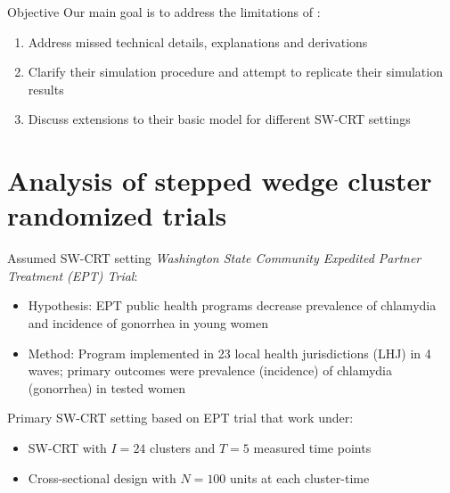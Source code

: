 \documentclass[9pt]{beamer}
\begin{document}
\begin{frame}{Objective}
Our main goal is to address the limitations of \citet{Hussey:2007}:
\vspace{1.5em}

\begin{enumerate}
\setlength\itemsep{1.5em}

\item
Address missed technical details, explanations and derivations

\item
Clarify their simulation procedure and attempt to replicate their simulation results

\item
Discuss extensions to their basic model for different SW-CRT settings

\end{enumerate}

\end{frame}



\section{Analysis of stepped wedge cluster randomized trials}



\begin{frame}{Assumed SW-CRT setting}
\textit{Washington State Community Expedited Partner Treatment (EPT) Trial}:
\begin{itemize}

\item
Hypothesis: EPT public health programs decrease prevalence of chlamydia and incidence of gonorrhea in young women

\item
Method: Program implemented in 23 local health jurisdictions (LHJ) in 4 waves; primary outcomes were prevalence (incidence) of chlamydia (gonorrhea) in tested women
\end{itemize}
\vspace{2em}

Primary SW-CRT setting based on EPT trial that \citet{Hussey:2007} work under:
\begin{itemize}

\item
SW-CRT with $I=24$ clusters and $T=5$ measured time points

\item
Cross-sectional design with $N=100$ units at each cluster-time

\end{itemize}
\end{frame}
\end{document}
